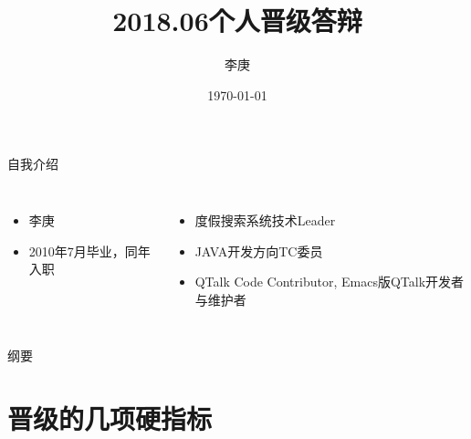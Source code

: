 \documentclass{beamer}
\begin{document}
\begin{CJK}{UTF8}{gbsn}

\title{2018.06个人晋级答辩}


\author{李庚}


\date{\today}




\begin{frame}
  \titlepage
\end{frame}

\begin{frame}{自我介绍}
  \begin{columns}
    \begin{itemize}
      \item { 李庚 }
      \item { 2010年7月毕业，同年入职 }
    \end{itemize}
    \begin{itemize}[1]
    \item 度假搜索系统技术Leader
    \item JAVA开发方向TC委员
    \item QTalk Code Contributor, Emacs版QTalk开发者与维护者
    \end{itemize}
  \end{columns}  
\end{frame}

\begin{frame}{纲要}
  \tableofcontents
\end{frame}

\section{晋级的几项硬指标}


\end{CJK}
\end{document}
